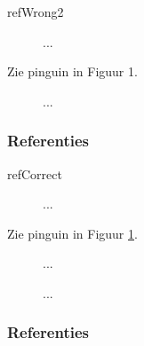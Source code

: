 \documentclass{cursuspresentatie}
\begin{document}
\begin{saveblock}{refWrong2}
	\begin{highlightblock}[gobble=8,linewidth=\textwidth,
		framexleftmargin=0.25em,xleftmargin=0.25em]
		\begin{figure} %
			... %
		\end{figure}
		Zie pinguin in Figuur 1.
		\begin{figure} %
			... %
		\end{figure}
	\end{highlightblock}
\end{saveblock}

\begin{frame}
	\frametitle{Referenties}

	\unless\ifishandout
	\fi

\end{frame}

\begin{saveblock}{refCorrect}
	\begin{highlightblock}[gobble=8,linewidth=\textwidth,
		framexleftmargin=0.25em,xleftmargin=0.25em]
		\begin{figure} %
			... %
		\end{figure}
		Zie pinguin in Figuur \ref{fig:pinguin}.
		\begin{figure} %
			... %
			\caption{...}\label{fig:pinguin}
		\end{figure}
	\end{highlightblock}
\end{saveblock}

\begin{frame}
	\frametitle{Referenties}

\end{frame}
\end{document}
